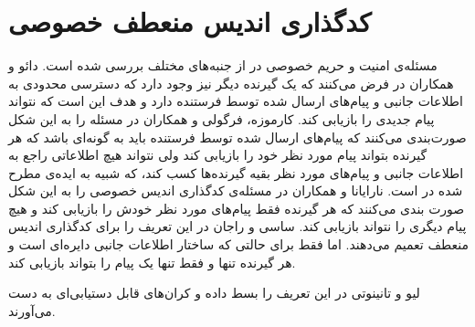 \section{کدگذاری اندیس منعطف خصوصی}
\label{sec:privatepliable}
مسئله‌ی امنیت و حریم خصوصی در 
\icod
 از جنبه‌های مختلف بررسی شده است. دائو و همکاران در
\cite{6166891}
فرض می‌کنند که یک گیرنده دیگر نیز وجود دارد که دسترسی محدودی به اطلاعات جانبی و پیام‌های ارسال شده توسط فرستنده دارد و هدف این است که نتواند پیام جدیدی را بازیابی کند. کارموزه، فرگولی و همکاران در
\cite{8006988}
مسئله را به این شکل صورت‌بندی می‌کنند که پیام‌های ارسال شده توسط فرستنده باید به گونه‌ای باشد که هر گیرنده بتواند پیام مورد نظر خود را بازیابی کند ولی نتواند هیچ اطلاعاتی راجع به اطلاعات جانبی و پیام‌های مورد نظر بقیه گیرنده‌ها کسب کند، که شبیه به ایده‌ی
	مطرح شده در
\cite{7889028}
است.
نارایانا و همکاران در
\cite{9627083}
مسئله‌ی کدگذاری اندیس خصوصی را به این شکل صورت بندی می‌کنند که هر گیرنده فقط پیام‌های مورد نظر خودش را بازیابی کند و هیچ پیام دیگری را نتواند بازیابی کند. ساسی و راجان در
\cite{sasi2019pliable}
این تعریف را برای کدگذاری اندیس منعطف تعمیم می‌دهند. اما فقط برای حالتی که ساختار اطلاعات جانبی دایره‌ای است و هر گیرنده تنها و فقط تنها یک پیام را بتواند بازیابی کند.

لیو و تانینوتی در 
\cite{8989161}
این تعریف را بسط داده و کران‌های قابل دستیابی‌ای به دست می‌آورند.